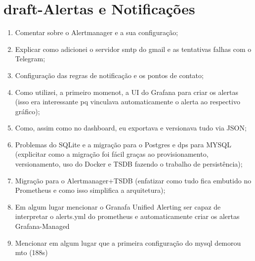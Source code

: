 {\section{draft-Alertas e Notificações}
\label{section:draft-Alertas}
\begin{enumerate}
  \item Comentar sobre o Alertmanager e a sua configuração;
  \item Explicar como adicionei o servidor smtp do gmail e as tentativas falhas com o Telegram;
  \item Configuração das regras de notificação e os pontos de contato;
  \item Como utilizei, a primeiro momenot, a UI do Grafana para criar os alertas (isso era interessante pq vinculava automaticamente o alerta ao respectivo gráfico);
  \item Como, assim como no dashboard, eu exportava e versionava tudo via JSON;
  \item Problemas do SQLite e a migração para o Postgres e dps para MYSQL (explicitar como a migração foi fácil graças ao provisionamento, versionamento, uso do Docker e TSDB fazendo o trabalho de persistência);
  \item Migração para o Alertmanager+TSDB (enfatizar como tudo fica embutido no Prometheus e como isso simplifica a arquitetura);
  \item Em algum lugar mencionar o Granafa Unified Alerting ser capaz de interpretar o alerts.yml do prometheus e automaticamente criar os alertas Grafana-Managed
  \item Mencionar em algum lugar que a primeira configuração do mysql demorou mto (188s)
\end{enumerate}


}



